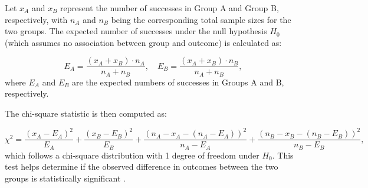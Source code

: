\documentclass[magisterska, english]{pwr_wmat_praca_dyplomowa}
\theoremstyle{plain}
\numberwithin{theorem}{chapter}
\theoremstyle{definition}
\numberwithin{theorem}{chapter}
\begin{document}
Let \(x_A\) and \(x_B\) represent the number of successes in Group A and Group B, respectively, with \(n_A\) and \(n_B\) being the corresponding total sample sizes for the two groups. The expected number of successes under the null hypothesis \(H_0\) (which assumes no association between group and outcome) is calculated as:

\[
E_A = \frac{(x_A + x_B) \cdot n_A}{n_A + n_B}, \quad E_B = \frac{(x_A + x_B) \cdot n_B}{n_A + n_B},
\]
where \(E_A\) and \(E_B\) are the expected numbers of successes in Groups A and B, respectively.

The chi-square statistic is then computed as:

\[
\chi^2 = \frac{(x_A - E_A)^2}{E_A} + \frac{(x_B - E_B)^2}{E_B} + \frac{(n_A - x_A - (n_A - E_A))^2}{n_A - E_A} + \frac{(n_B - x_B - (n_B - E_B))^2}{n_B - E_B},
\]
which follows a chi-square distribution with 1 degree of freedom under \(H_0\). This test helps determine if the observed difference in outcomes between the two groups is statistically significant \cite{Agresti2002}.




%
%
%
\end{document}
